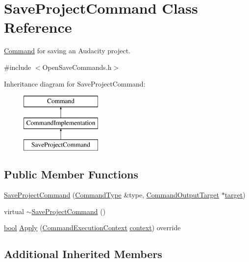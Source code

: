 \hypertarget{class_save_project_command}{}\section{Save\+Project\+Command Class Reference}
\label{class_save_project_command}


\hyperlink{class_command}{Command} for saving an Audacity project.  




{\ttfamily \#include $<$Open\+Save\+Commands.\+h$>$}

Inheritance diagram for Save\+Project\+Command\+:\begin{figure}[H]
\begin{center}
\leavevmode
\includegraphics[height=3.000000cm]{class_save_project_command}
\end{center}
\end{figure}
\subsection*{Public Member Functions}
\begin{DoxyCompactItemize}
\item 
\hyperlink{class_save_project_command_a2eed44504a230999b7518510da7515b1}{Save\+Project\+Command} (\hyperlink{class_command_type}{Command\+Type} \&type, \hyperlink{class_command_output_target}{Command\+Output\+Target} $\ast$\hyperlink{lib_2expat_8h_a15a257516a87decb971420e718853137}{target})
\item 
virtual \hyperlink{class_save_project_command_a10f8cdd701b2f805de0a19f8e1379990}{$\sim$\+Save\+Project\+Command} ()
\item 
\hyperlink{mac_2config_2i386_2lib-src_2libsoxr_2soxr-config_8h_abb452686968e48b67397da5f97445f5b}{bool} \hyperlink{class_save_project_command_ab3c74fa18e8654b96048385f4a845c1b}{Apply} (\hyperlink{class_command_execution_context}{Command\+Execution\+Context} \hyperlink{structcontext}{context}) override
\end{DoxyCompactItemize}
\subsection*{Additional Inherited Members}


